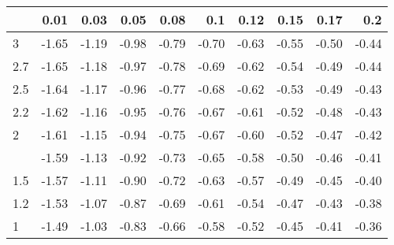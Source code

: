 
\begin{tabular}{lrrrrrrrrr}
\toprule
  & 0.01 & 0.03 & 0.05 & 0.08 & 0.1 & 0.12 & 0.15 & 0.17 & 0.2\\
\midrule
3 & -1.65 & -1.19 & -0.98 & -0.79 & -0.70 & -0.63 & -0.55 & -0.50 & -0.44\\
2.7 & -1.65 & -1.18 & -0.97 & -0.78 & -0.69 & -0.62 & -0.54 & -0.49 & -0.44\\
2.5 & -1.64 & -1.17 & -0.96 & -0.77 & -0.68 & -0.62 & -0.53 & -0.49 & -0.43\\
2.2 & -1.62 & -1.16 & -0.95 & -0.76 & -0.67 & -0.61 & -0.52 & -0.48 & -0.43\\
2 & -1.61 & -1.15 & -0.94 & -0.75 & -0.67 & -0.60 & -0.52 & -0.47 & -0.42\\
\addlinespace
1.7 & -1.59 & -1.13 & -0.92 & -0.73 & -0.65 & -0.58 & -0.50 & -0.46 & -0.41\\
1.5 & -1.57 & -1.11 & -0.90 & -0.72 & -0.63 & -0.57 & -0.49 & -0.45 & -0.40\\
1.2 & -1.53 & -1.07 & -0.87 & -0.69 & -0.61 & -0.54 & -0.47 & -0.43 & -0.38\\
1 & -1.49 & -1.03 & -0.83 & -0.66 & -0.58 & -0.52 & -0.45 & -0.41 & -0.36\\
\bottomrule
\end{tabular}
